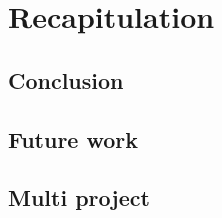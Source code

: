 \chapter{Recapitulation}
  \section{Conclusion}
  \section{Future work}
  \section{Multi project} %




\appendix


